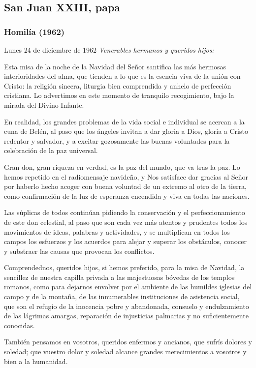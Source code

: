 \subsection{San Juan XXIII, papa}

\subsubsection{Homilía (1962)}

Lunes 24 de diciembre de 1962 \emph{Venerables hermanos y queridos hijos:}

Esta misa de la noche de la Navidad del Señor santifica las más hermosas interioridades del alma, que tienden a lo que es la esencia viva de la unión con Cristo: la religión sincera, liturgia bien comprendida y anhelo de perfección cristiana. Lo advertimos en este momento de tranquilo recogimiento, bajo la mirada del Divino Infante.

En realidad, los grandes problemas de la vida social e individual se acercan a la cuna de Belén, al paso que los ángeles invitan a dar gloria a Dios, gloria a Cristo redentor y salvador, y a excitar gozosamente las buenas voluntades para la celebración de la paz universal.

Gran don, gran riqueza en verdad, es la paz del mundo, que va tras la paz. Lo hemos repetido en el radiomensaje navideño, y Nos satisface dar gracias al Señor por haberlo hecho acoger con buena voluntad de un extremo al otro de la tierra, como confirmación de la luz de esperanza encendida y viva en todas las naciones.

Las súplicas de todos continúan pidiendo la conservación y el perfeccionamiento de este don celestial, al paso que son cada vez más atentos y prudentes todos los movimientos de ideas, palabras y actividades, y se multiplican en todos los campos los esfuerzos y los acuerdos para alejar y superar los obstáculos, conocer y substraer las causas que provocan los conflictos.

Comprendednos, queridos hijos, si hemos preferido, para la misa de Navidad, la sencillez de nuestra capilla privada a las majestuosas bóvedas de los templos romanos, como para dejarnos envolver por el ambiente de las humildes iglesias del campo y de la montaña, de las innumerables instituciones de asistencia social, que son el refugio de la inocencia pobre y abandonada, consuelo y endulzamiento de las lágrimas amargas, reparación de injusticias palmarias y no suficientemente conocidas.

También pensamos en vosotros, queridos enfermos y ancianos, que sufrís dolores y soledad; que vuestro dolor y soledad alcance grandes merecimientos a vosotros y bien a la humanidad.

